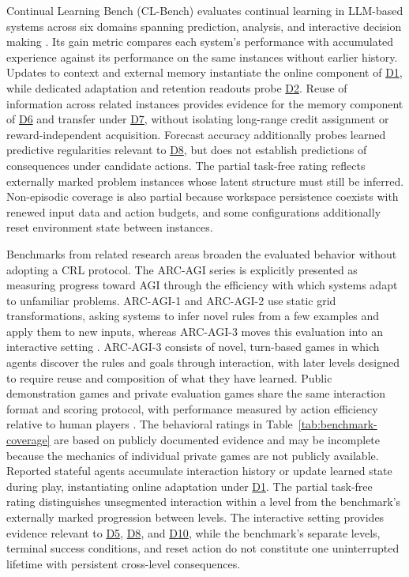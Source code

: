 \documentclass[10pt,journal,compsoc]{IEEEtran}
\DeclareRobustCommand{\Dref}[1]{\hyperref[sec:d#1]{D#1}}
\begin{document}
Continual Learning Bench (CL-Bench) evaluates continual learning in LLM-based systems across six domains spanning prediction, analysis, and interactive decision making \cite{asawa2026}.
Its gain metric compares each system's performance with accumulated experience against its performance on the same instances without earlier history.
Updates to context and external memory instantiate the online component of \Dref{1}, while dedicated adaptation and retention readouts probe \Dref{2}.
Reuse of information across related instances provides evidence for the memory component of \Dref{6} and transfer under \Dref{7}, without isolating long-range credit assignment or reward-independent acquisition.
Forecast accuracy additionally probes learned predictive regularities relevant to \Dref{8}, but does not establish predictions of consequences under candidate actions.
The partial task-free rating reflects externally marked problem instances whose latent structure must still be inferred.
Non-episodic coverage is also partial because workspace persistence coexists with renewed input data and action budgets, and some configurations additionally reset environment state between instances.

Benchmarks from related research areas broaden the evaluated behavior without adopting a CRL protocol.
The ARC-AGI series is explicitly presented as measuring progress toward AGI through the efficiency with which systems adapt to unfamiliar problems.
ARC-AGI-1 and ARC-AGI-2 use static grid transformations, asking systems to infer novel rules from a few examples and apply them to new inputs, whereas ARC-AGI-3 moves this evaluation into an interactive setting \cite{arcprize2026}.
ARC-AGI-3 consists of novel, turn-based games in which agents discover the rules and goals through interaction, with later levels designed to require reuse and composition of what they have learned.
Public demonstration games and private evaluation games share the same interaction format and scoring protocol, with performance measured by action efficiency relative to human players \cite{arcprize2026}.
The behavioral ratings in Table~\ref{tab:benchmark-coverage} are based on publicly documented evidence and may be incomplete because the mechanics of individual private games are not publicly available.
Reported stateful agents accumulate interaction history or update learned state during play, instantiating online adaptation under \Dref{1}.
The partial task-free rating distinguishes unsegmented interaction within a level from the benchmark's externally marked progression between levels.
The interactive setting provides evidence relevant to \Dref{5}, \Dref{8}, and \Dref{10}, while the benchmark's separate levels, terminal success conditions, and reset action do not constitute one uninterrupted lifetime with persistent cross-level consequences.
\end{document}
